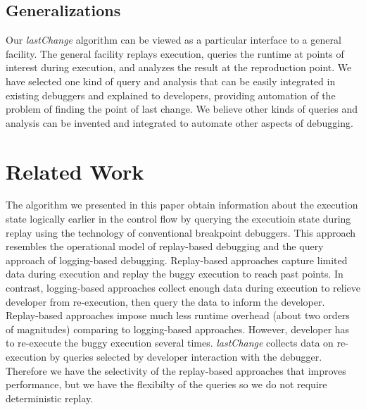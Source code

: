 \documentclass{sig-alternate}
\begin{document}
\subsection{Generalizations}
Our \textit{lastChange} algorithm can be viewed as a particular interface to a general facility. 
The general facility replays execution, queries the runtime at points of interest during execution,
and analyzes the result at the reproduction point. We have selected one kind of query and analysis
that can be easily integrated in existing debuggers and explained to developers, providing automation of 
the problem of finding the point of last change. We believe other
kinds of queries and analysis can be invented and integrated to automate other aspects of debugging.

\section{Related Work}
\label{sec:relatedWork}

The algorithm we presented in this paper obtain information about
the execution state logically earlier in the control flow by querying 
the executioin state during replay using the technology of 
conventional breakpoint debuggers.  This
approach resembles the operational model of replay-based debugging 
and the query approach of logging-based
debugging.  Replay-based approaches capture limited data during
execution and replay the buggy execution to reach past points. In
contrast, logging-based approaches collect enough data during
execution to relieve developer from re-execution, then query the data to 
inform the developer. Replay-based
approaches impose much less runtime overhead (about two orders of
magnitudes) comparing to logging-based approaches. However, developer
has to re-execute the buggy execution several
times. \textit{lastChange} collects data on re-execution by queries
selected by developer interaction with the debugger. Therefore we have 
the selectivity of the replay-based approaches that improves performance, 
but we have the flexibilty of the queries so we do not require deterministic replay.
\end{document}
